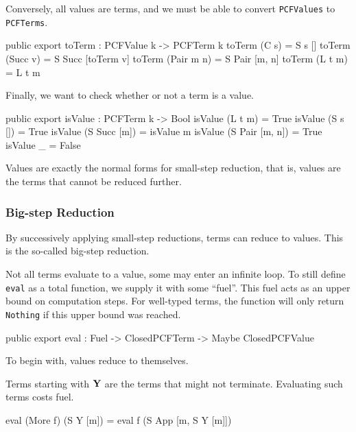 Conversely, all values are terms, and we must be able to convert \lstinline{PCFValues}
to \lstinline{PCFTerms}.

\begin{code}
public export
toTerm : PCFValue k -> PCFTerm k
toTerm (C s)      = S s []
toTerm (Succ v)   = S Succ [toTerm v]
toTerm (Pair m n) = S Pair [m, n]
toTerm (L t m)    = L t m
\end{code}

Finally, we want to check whether or not a term is a value.

\begin{code}
public export
isValue : PCFTerm k -> Bool
isValue (L t m)         = True
isValue (S s [])        = True
isValue (S Succ [m])    = isValue m
isValue (S Pair [m, n]) = True
isValue _               = False
\end{code}

Values are exactly the normal forms for small-step reduction, that is, values
are the terms that cannot be reduced further.

\subsubsection{Big-step Reduction}

By successively applying small-step reductions, terms can reduce to values.
This is the so-called big-step reduction.

Not all terms evaluate to a value, some may enter an infinite loop.
To still define \lstinline{eval} as a total function, we supply it with some ``fuel''.
This fuel acts as an upper bound on computation steps. For well-typed terms,
the function will only return \lstinline{Nothing} if this upper bound was reached.

\begin{code}
public export
eval : Fuel -> ClosedPCFTerm -> Maybe ClosedPCFValue
\end{code}

To begin with, values reduce to themselves.


Terms starting with $\textbf{Y}$ are the terms that might not terminate.
Evaluating such terms costs fuel.

\begin{code}
eval (More f) (S Y [m]) = eval f (S App [m, S Y [m]])
\end{code}

